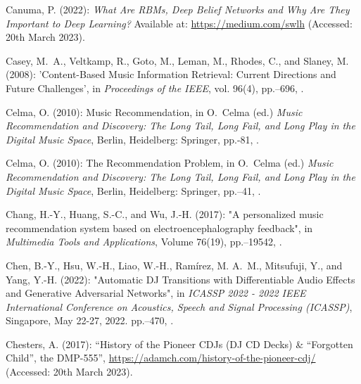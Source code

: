 \documentclass[11pt,titlepage,oneside]{book}
\begin{document}
\begin{thebibliography}{97}
	Canuma, P. (2022): \textit{What Are RBMs, Deep Belief Networks and Why Are They Important to Deep Learning?} Available at: \url{https://medium.com/swlh} 
	(Accessed: 20th March 2023).
	
	Casey, M.~A., Veltkamp, R., Goto, M., Leman, M., Rhodes, C., and Slaney, M.
	(2008): 'Content-{Based} {Music} {Information} {Retrieval}: {Current}
		{Directions} and {Future} {Challenges}', in \textit{Proceedings of the IEEE},
	vol. 96(4), pp.--696, . 
	
	Celma, O. (2010{}): Music Recommendation, in
	O.~Celma (ed.) \textit{Music {Recommendation} and {Discovery}: {The} {Long}
		{Tail}, {Long} {Fail}, and {Long} {Play} in the {Digital} {Music} {Space}},
	Berlin, Heidelberg: Springer, pp.-81,
	.
	
	Celma, O. (2010{}): The {Recommendation} {Problem}, in
	O.~Celma (ed.) \textit{Music {Recommendation} and {Discovery}: {The} {Long}
		{Tail}, {Long} {Fail}, and {Long} {Play} in the {Digital} {Music} {Space}},
	Berlin, Heidelberg: Springer, pp.--41,
	.
	
	Chang, H.-Y., Huang, S.-C., and Wu, J.-H. (2017): "A personalized music
		recommendation system based on electroencephalography feedback", in
	\textit{Multimedia Tools and Applications}, Volume 76(19), pp.--19542, .
	
	Chen, B.-Y., Hsu, W.-H., Liao, W.-H., Ramírez, M. A.~M., Mitsufuji, Y., and
	Yang, Y.-H. (2022): "Automatic {DJ} {Transitions} with
		{Differentiable} {Audio} {Effects} and {Generative} {Adversarial}
		{Networks}", in \textit{{ICASSP} 2022 - 2022 {IEEE} {International}
		{Conference} on {Acoustics}, {Speech} and {Signal} {Processing} ({ICASSP})}, Singapore, May 22-27, 2022.
	pp.--470, .
	
	Chesters, A. (2017): \enquote{History of the {Pioneer} {CDJs} ({DJ} {CD}
		{Decks}) \& “{Forgotten} {Child}”, the {DMP}-555},
	\urlprefix\url{https://adamch.com/history-of-the-pioneer-cdj/} (Accessed: 20th March 2023).
	

\end{thebibliography}
\end{document}
